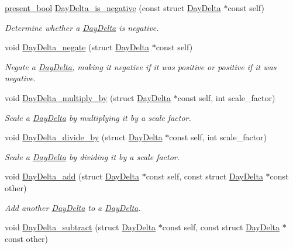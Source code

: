 \begin{DoxyCompactItemize}
\hyperlink{types_8h_a1c24e2cdd988b886e889080ded176ae0}{present\-\_\-bool} \hyperlink{day-delta_8h_ab4347a4d40f2e9577ce86f3fb5fb004d}{Day\-Delta\-\_\-is\-\_\-negative} (const struct \hyperlink{structDayDelta}{Day\-Delta} $\ast$const self)
\begin{DoxyCompactList}\small\item\em Determine whether a \hyperlink{structDayDelta}{Day\-Delta} is negative. \end{DoxyCompactList}\item 
void \hyperlink{day-delta_8h_a9deb74bc8d748a21449a16e658f16432}{Day\-Delta\-\_\-negate} (struct \hyperlink{structDayDelta}{Day\-Delta} $\ast$const self)
\begin{DoxyCompactList}\small\item\em Negate a \hyperlink{structDayDelta}{Day\-Delta}, making it negative if it was positive or positive if it was negative. \end{DoxyCompactList}\item 
void \hyperlink{day-delta_8h_af8c4a730c36c38da48ba2d6df982c167}{Day\-Delta\-\_\-multiply\-\_\-by} (struct \hyperlink{structDayDelta}{Day\-Delta} $\ast$const self, int scale\-\_\-factor)
\begin{DoxyCompactList}\small\item\em Scale a \hyperlink{structDayDelta}{Day\-Delta} by multiplying it by a scale factor. \end{DoxyCompactList}\item 
void \hyperlink{day-delta_8h_a03f5153b765a355870053d9cf1ce5c78}{Day\-Delta\-\_\-divide\-\_\-by} (struct \hyperlink{structDayDelta}{Day\-Delta} $\ast$const self, int scale\-\_\-factor)
\begin{DoxyCompactList}\small\item\em Scale a \hyperlink{structDayDelta}{Day\-Delta} by dividing it by a scale factor. \end{DoxyCompactList}\item 
void \hyperlink{day-delta_8h_a1d879b02971a0c302622e56b577ceb23}{Day\-Delta\-\_\-add} (struct \hyperlink{structDayDelta}{Day\-Delta} $\ast$const self, const struct \hyperlink{structDayDelta}{Day\-Delta} $\ast$const other)
\begin{DoxyCompactList}\small\item\em Add another \hyperlink{structDayDelta}{Day\-Delta} to a \hyperlink{structDayDelta}{Day\-Delta}. \end{DoxyCompactList}\item 
void \hyperlink{day-delta_8h_a6fd32ca3c633ebe279df2a468fd1d91e}{Day\-Delta\-\_\-subtract} (struct \hyperlink{structDayDelta}{Day\-Delta} $\ast$const self, const struct \hyperlink{structDayDelta}{Day\-Delta} $\ast$const other)

\end{DoxyCompactItemize}
